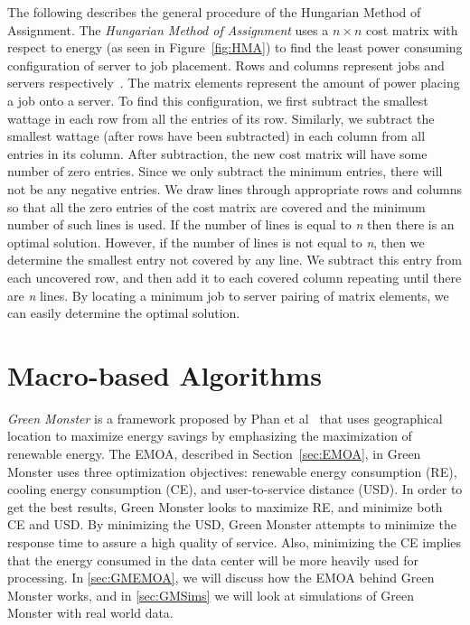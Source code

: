\documentclass{sig-alternate}
\begin{document}
The following describes the general procedure of the Hungarian Method of Assignment. The \emph{Hungarian Method of Assignment} uses a $n \times n$ cost matrix with respect to energy (as seen in Figure~\ref{fig:HMA}) to find the least power consuming configuration of server to job placement. Rows and columns represent jobs and servers respectively~\cite{Han}. The matrix elements represent the amount of power placing a job onto a server. To find this configuration, we first subtract the smallest wattage in each row from all the entries of its row. Similarly, we subtract the smallest wattage (after rows have been subtracted) in each column from all entries in its column. After subtraction, the new cost matrix will have some number of zero entries. Since we only subtract the minimum entries, there will not be any negative entries. We draw lines through appropriate rows and columns so that all the zero entries of the cost matrix are covered and the minimum number of such lines is used.  If the number of lines is equal to \emph{n} then there is an optimal solution. However, if the number of lines is not equal to \emph{n}, then we determine the smallest entry not covered by any line. We subtract this entry from each uncovered row, and then add it to each covered column repeating until there are \emph{n} lines. By locating a minimum job to server pairing of matrix elements, we can easily determine the optimal solution.  

\section{Macro-based Algorithms}
\label{sec:MacAl}

\emph{Green Monster} is a framework proposed by Phan et al~\cite{Phan} that uses geographical location to maximize energy savings by emphasizing the maximization of renewable energy. The EMOA, described in Section~\ref{sec:EMOA}, in Green Monster uses three optimization objectives: renewable energy consumption (RE), cooling energy consumption (CE), and user-to-service distance (USD). In order to get the best results, Green Monster looks to maximize RE, and minimize both CE and USD. By minimizing the USD, Green Monster attempts to minimize the response time to assure a high quality of service. Also, minimizing the CE implies that the energy consumed in the data center will be more heavily used for processing. In \ref{sec:GMEMOA}, we will discuss how the EMOA behind Green Monster works, and in \ref{sec:GMSims} we will look at simulations of Green Monster with real world data.
\end{document}
